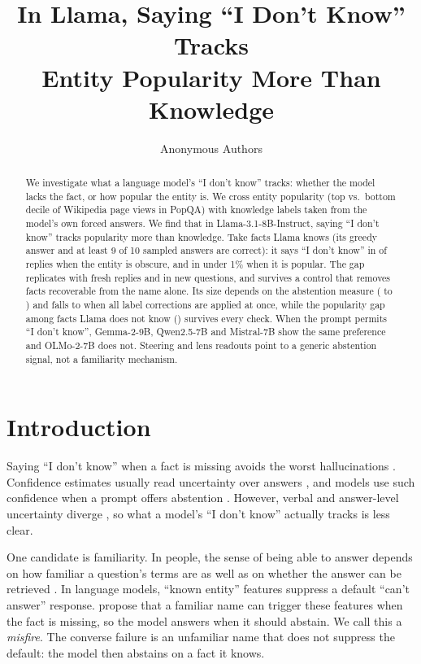 \documentclass{article}
\title{In Llama, Saying ``I Don't Know'' Tracks\\Entity Popularity More Than Knowledge}
\author{Anonymous Authors}
\newcommand{\idk}{``I don't know''}
\begin{document}
\maketitle

\begin{abstract}
We investigate what a language model's \idk{} tracks: whether the model lacks the fact, or how popular the entity is. We cross entity popularity (top vs.\ bottom decile of Wikipedia page views in PopQA) with knowledge labels taken from the model's own forced answers. We find that in Llama-3.1-8B-Instruct, saying \idk{} tracks popularity more than knowledge. Take facts Llama knows (its greedy answer and at least 9 of 10 sampled answers are correct): it says \idk{} in \tcObsKnownAbsPct{} of replies when the entity is obscure, and in under 1\% when it is popular. The gap replicates with fresh replies and in new questions, and survives a control that removes facts recoverable from the name alone. Its size depends on the abstention measure (\hjLlamaDiff{} to \faLlamaRegexDiff) and falls to \rcJoint{} \rcJointCI{} when all label corrections are applied at once, while the popularity gap among facts Llama does not know (\rcUnk) survives every check. When the prompt permits \idk, Gemma-2-9B, Qwen2.5-7B and Mistral-7B show the same preference and OLMo-2-7B does not. Steering and lens readouts point to a generic abstention signal, not a familiarity mechanism.
\end{abstract}

\section{Introduction}

Saying \idk{} when a fact is missing avoids the worst hallucinations \citep{kalai2025hallucinate}. Confidence estimates usually read uncertainty over answers \citep{kadavath2022know,kuhn2023semantic,stolfo2024confidence}, and models use such confidence when a prompt offers abstention \citep{kumaran2026confidence}. However, verbal and answer-level uncertainty diverge \citep{ji2025hedging}, so what a model's \idk{} actually tracks is less clear.

One candidate is familiarity. In people, the sense of being able to answer depends on how familiar a question's terms are as well as on whether the answer can be retrieved \citep{reder1992,schwartz1992,koriat2001cascade}. In language models, ``known entity'' features suppress a default ``can't answer'' response. \citet{lindsey2025biology} propose that a familiar name can trigger these features when the fact is missing, so the model answers when it should abstain. We call this a \emph{misfire}. The converse failure is an unfamiliar name that does not suppress the default: the model then abstains on a fact it knows.
\end{document}
